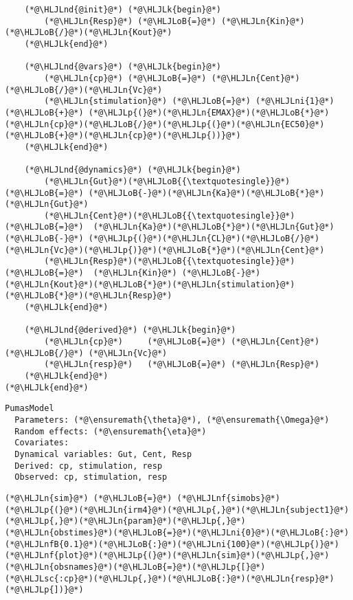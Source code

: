 \documentclass[12pt,a4paper]{article}
\newcommand{\HLJLk}[1]{\textcolor[RGB]{148,91,176}{\textbf{#1}}}
\newcommand{\HLJLn}[1]{#1}
\newcommand{\HLJLnd}[1]{\textcolor[RGB]{214,102,97}{#1}}
\newcommand{\HLJLnf}[1]{\textcolor[RGB]{66,102,213}{#1}}
\newcommand{\HLJLsc}[1]{\textcolor[RGB]{201,61,57}{#1}}
\newcommand{\HLJLnfB}[1]{\textcolor[RGB]{59,151,46}{#1}}
\newcommand{\HLJLni}[1]{\textcolor[RGB]{59,151,46}{#1}}
\newcommand{\HLJLoB}[1]{\textcolor[RGB]{102,102,102}{\textbf{#1}}}
\newcommand{\HLJLp}[1]{#1}
\begin{document}
\begin{lstlisting}
    (*@\HLJLnd{@init}@*) (*@\HLJLk{begin}@*)
        (*@\HLJLn{Resp}@*) (*@\HLJLoB{=}@*) (*@\HLJLn{Kin}@*)(*@\HLJLoB{/}@*)(*@\HLJLn{Kout}@*)
    (*@\HLJLk{end}@*)

    (*@\HLJLnd{@vars}@*) (*@\HLJLk{begin}@*)
        (*@\HLJLn{cp}@*) (*@\HLJLoB{=}@*) (*@\HLJLn{Cent}@*)(*@\HLJLoB{/}@*)(*@\HLJLn{Vc}@*)
        (*@\HLJLn{stimulation}@*) (*@\HLJLoB{=}@*) (*@\HLJLni{1}@*) (*@\HLJLoB{+}@*) (*@\HLJLp{(}@*)(*@\HLJLn{EMAX}@*)(*@\HLJLoB{*}@*)(*@\HLJLn{cp}@*)(*@\HLJLoB{/}@*)(*@\HLJLp{(}@*)(*@\HLJLn{EC50}@*)(*@\HLJLoB{+}@*)(*@\HLJLn{cp}@*)(*@\HLJLp{))}@*)
    (*@\HLJLk{end}@*)

    (*@\HLJLnd{@dynamics}@*) (*@\HLJLk{begin}@*)
        (*@\HLJLn{Gut}@*)(*@\HLJLoB{{\textquotesingle}}@*)    (*@\HLJLoB{=}@*) (*@\HLJLoB{-}@*)(*@\HLJLn{Ka}@*)(*@\HLJLoB{*}@*)(*@\HLJLn{Gut}@*)
        (*@\HLJLn{Cent}@*)(*@\HLJLoB{{\textquotesingle}}@*)   (*@\HLJLoB{=}@*)  (*@\HLJLn{Ka}@*)(*@\HLJLoB{*}@*)(*@\HLJLn{Gut}@*) (*@\HLJLoB{-}@*) (*@\HLJLp{(}@*)(*@\HLJLn{CL}@*)(*@\HLJLoB{/}@*)(*@\HLJLn{Vc}@*)(*@\HLJLp{)}@*)(*@\HLJLoB{*}@*)(*@\HLJLn{Cent}@*)
        (*@\HLJLn{Resp}@*)(*@\HLJLoB{{\textquotesingle}}@*)   (*@\HLJLoB{=}@*)  (*@\HLJLn{Kin}@*) (*@\HLJLoB{-}@*) (*@\HLJLn{Kout}@*)(*@\HLJLoB{*}@*)(*@\HLJLn{stimulation}@*)(*@\HLJLoB{*}@*)(*@\HLJLn{Resp}@*)
    (*@\HLJLk{end}@*)

    (*@\HLJLnd{@derived}@*) (*@\HLJLk{begin}@*)
        (*@\HLJLn{cp}@*)     (*@\HLJLoB{=}@*) (*@\HLJLn{Cent}@*) (*@\HLJLoB{/}@*) (*@\HLJLn{Vc}@*)
        (*@\HLJLn{resp}@*)   (*@\HLJLoB{=}@*) (*@\HLJLn{Resp}@*)
    (*@\HLJLk{end}@*)
(*@\HLJLk{end}@*)
\end{lstlisting}

\begin{lstlisting}
PumasModel
  Parameters: (*@\ensuremath{\theta}@*), (*@\ensuremath{\Omega}@*)
  Random effects: (*@\ensuremath{\eta}@*)
  Covariates: 
  Dynamical variables: Gut, Cent, Resp
  Derived: cp, stimulation, resp
  Observed: cp, stimulation, resp
\end{lstlisting}


\begin{lstlisting}
(*@\HLJLn{sim}@*) (*@\HLJLoB{=}@*) (*@\HLJLnf{simobs}@*)(*@\HLJLp{(}@*)(*@\HLJLn{irm4}@*)(*@\HLJLp{,}@*)(*@\HLJLn{subject1}@*)(*@\HLJLp{,}@*)(*@\HLJLn{param}@*)(*@\HLJLp{,}@*)(*@\HLJLn{obstimes}@*)(*@\HLJLoB{=}@*)(*@\HLJLni{0}@*)(*@\HLJLoB{:}@*)(*@\HLJLnfB{0.1}@*)(*@\HLJLoB{:}@*)(*@\HLJLni{100}@*)(*@\HLJLp{)}@*)
(*@\HLJLnf{plot}@*)(*@\HLJLp{(}@*)(*@\HLJLn{sim}@*)(*@\HLJLp{,}@*) (*@\HLJLn{obsnames}@*)(*@\HLJLoB{=}@*)(*@\HLJLp{[}@*)(*@\HLJLsc{:cp}@*)(*@\HLJLp{,}@*)(*@\HLJLoB{:}@*)(*@\HLJLn{resp}@*)(*@\HLJLp{])}@*)
\end{lstlisting}
\end{document}

